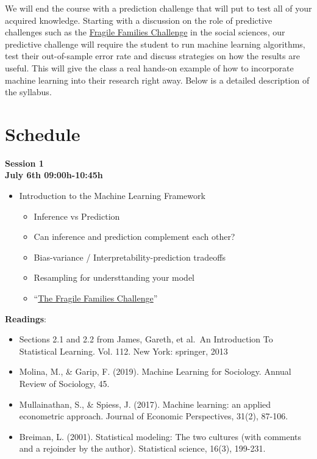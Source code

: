\documentclass[
]{book}
\providecommand{\tightlist}{%
  \setlength{\itemsep}{0pt}\setlength{\parskip}{0pt}}
\begin{document}
We will end the course with a prediction challenge that will put to test all of your acquired knowledge. Starting with a discussion on the role of predictive challenges such as the \href{http://www.fragilefamilieschallenge.org/}{Fragile Families Challenge} in the social sciences, our predictive challenge will require the student to run machine learning algorithms, test their out-of-sample error rate and discuss strategies on how the results are useful. This will give the class a real hands-on example of how to incorporate machine learning into their research right away. Below is a detailed description of the syllabus.

\hypertarget{schedule}{%
\section{Schedule}\label{schedule}}

\textbf{Session 1}\\
\textbf{July 6th 09:00h-10:45h}

\begin{itemize}
\tightlist
\item
  Introduction to the Machine Learning Framework

  \begin{itemize}
  \tightlist
  \item
    Inference vs Prediction
  \item
    Can inference and prediction complement each other?
  \item
    Bias-variance / Interpretability-prediction tradeoffs
  \item
    Resampling for understtanding your model
  \item
    ``\href{http://www.fragilefamilieschallenge.org/}{The Fragile Families Challenge}''
  \end{itemize}
\end{itemize}

\textbf{Readings}:

\begin{itemize}
\item
  Sections 2.1 and 2.2 from James, Gareth, et al.~An Introduction To Statistical Learning. Vol. 112. New York: springer, 2013
\item
  Molina, M., \& Garip, F. (2019). Machine Learning for Sociology. Annual Review of Sociology, 45.
\item
  Mullainathan, S., \& Spiess, J. (2017). Machine learning: an applied econometric approach. Journal of Economic Perspectives, 31(2), 87-106.
\item
  Breiman, L. (2001). Statistical modeling: The two cultures (with comments and a rejoinder by the author). Statistical science, 16(3), 199-231.
\end{itemize}
\end{document}
